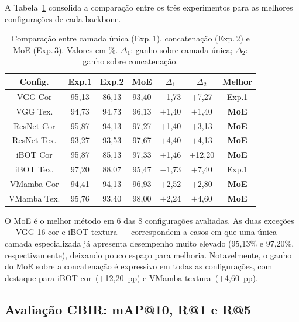 \documentclass[letterpaper, 10 pt, conference]{ieeeconf}
\begin{document}
A Tabela~\ref{tab_comparacao} consolida a comparação entre os três
experimentos para as melhores configurações de cada backbone.

\begin{table}[htbp]
\caption{Comparação entre camada única (Exp.\,1), concatenação (Exp.\,2)
         e MoE (Exp.\,3). Valores em \%. $\Delta_1$: ganho sobre
         camada única; $\Delta_2$: ganho sobre concatenação.}
\begin{center}
\begin{tabular}{c|c|c|c|c|c|c}
\hline
\textbf{Config.} & \textbf{Exp.1} & \textbf{Exp.2}
                 & \textbf{MoE} & \textbf{$\Delta_1$}
                 & \textbf{$\Delta_2$} & \textbf{Melhor} \\
\hline
VGG Cor      & 95,13 & 86,13 & 93,40 & $-$1,73 & $+$7,27 & Exp.1 \\
VGG Tex.     & 94,73 & 94,73 & 96,13 & $+$1,40 & $+$1,40 & \textbf{MoE} \\
ResNet Cor   & 95,87 & 94,13 & 97,27 & $+$1,40 & $+$3,13 & \textbf{MoE} \\
ResNet Tex.  & 93,27 & 93,53 & 97,67 & $+$4,40 & $+$4,13 & \textbf{MoE} \\
iBOT Cor     & 95,87 & 85,13 & 97,33 & $+$1,46 & $+$12,20 & \textbf{MoE} \\
iBOT Tex.    & 97,20 & 88,07 & 95,47 & $-$1,73 & $+$7,40 & Exp.1 \\
VMamba Cor   & 94,41 & 94,13 & 96,93 & $+$2,52 & $+$2,80 & \textbf{MoE} \\
VMamba Tex.  & 95,76 & 93,40 & 98,00 & $+$2,24 & $+$4,60 & \textbf{MoE} \\
\hline
\end{tabular}
\label{tab_comparacao}
\end{center}
\end{table}

O MoE é o melhor método em 6 das 8 configurações avaliadas.
As duas exceções — VGG-16 cor e iBOT textura — correspondem a casos em que
uma única camada especializada já apresenta desempenho muito elevado
(95,13\% e 97,20\%, respectivamente), deixando pouco espaço para melhoria.
Notavelmente, o ganho do MoE sobre a concatenação é expressivo em todas as
configurações, com destaque para iBOT cor~($+$12,20~pp) e VMamba
textura~($+$4,60~pp).

\subsection{Avaliação CBIR: mAP@10, R@1 e R@5}
\end{document}
